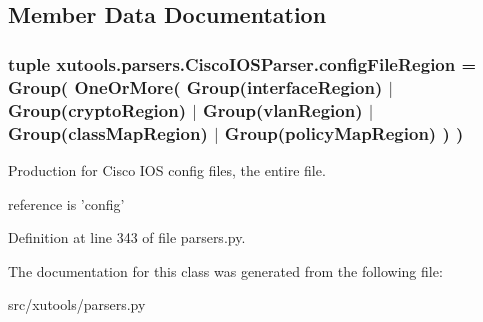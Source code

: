 \subsection{Member Data Documentation}
\hypertarget{classxutools_1_1parsers_1_1_cisco_i_o_s_parser_a8c7dfc0e81b2f3828cb64c831977c569}{
\subsubsection[{config\-File\-Region}]{\setlength{\rightskip}{0pt plus 5cm}tuple xutools.\-parsers.\-Cisco\-I\-O\-S\-Parser.\-config\-File\-Region = Group( One\-Or\-More( Group({\bf interface\-Region}) $|$ Group({\bf crypto\-Region}) $|$ Group({\bf vlan\-Region}) $|$ Group({\bf class\-Map\-Region}) $|$ Group({\bf policy\-Map\-Region}) ) )\hspace{0.3cm}{\ttfamily [static]}}}\label{classxutools_1_1parsers_1_1_cisco_i_o_s_parser_a8c7dfc0e81b2f3828cb64c831977c569}


Production for Cisco I\-O\-S config files, the entire file. 

reference is 'config' 

Definition at line 343 of file parsers.\-py.



The documentation for this class was generated from the following file\-:\begin{DoxyCompactItemize}
\item 
src/xutools/parsers.\-py\end{DoxyCompactItemize}

